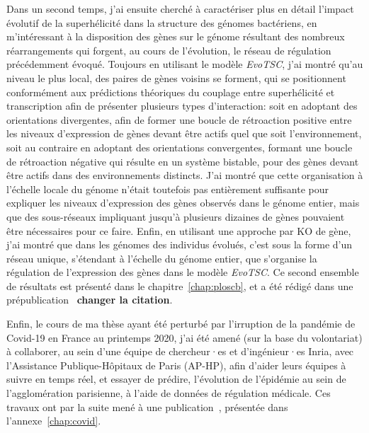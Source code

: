 Dans un second temps, j'ai ensuite cherché à caractériser plus en détail l'impact évolutif de la superhélicité dans la structure des génomes bactériens, en m'intéressant à la disposition des gènes sur le génome résultant des nombreux réarrangements qui forgent, au cours de l'évolution, le réseau de régulation précédemment évoqué.
Toujours en utilisant le modèle \emph{EvoTSC}, j'ai montré qu'au niveau le plus local, des paires de gènes voisins se forment, qui se positionnent conformément aux prédictions théoriques du couplage entre superhélicité et transcription afin de présenter plusieurs types d'interaction: soit en adoptant des orientations divergentes, afin de former une boucle de rétroaction positive entre les niveaux d'expression de gènes devant être actifs quel que soit l'environnement, soit au contraire en adoptant des orientations convergentes, formant une boucle de rétroaction négative qui résulte en un système bistable, pour des gènes devant être actifs dans des environnements distincts.
J'ai montré que cette organisation à l'échelle locale du génome n'était toutefois pas entièrement suffisante pour expliquer les niveaux d'expression des gènes observés dans le génome entier, mais que des sous-réseaux impliquant jusqu'à plusieurs dizaines de gènes pouvaient être nécessaires pour ce faire.
Enfin, en utilisant une approche par KO de gène, j'ai montré que dans les génomes des individus évolués, c'est sous la forme d'un réseau unique, s'étendant à l'échelle du génome entier, que s'organise la régulation de l'expression des gènes dans le modèle \emph{EvoTSC}.
Ce second ensemble de résultats est présenté dans le chapitre~\ref{chap:ploscb}, et a été rédigé dans une prépublication~\citep{grohens2021} \textbf{changer la citation}.

Enfin, le cours de ma thèse ayant été perturbé par l'irruption de la pandémie de Covid-19 en France au printemps 2020, j'ai été amené (sur la base du volontariat) à collaborer, au sein d'une équipe de chercheur·es et d'ingénieur·es Inria, avec l'Assistance Publique-Hôpitaux de Paris (AP-HP), afin d'aider leurs équipes à suivre en temps réel, et essayer de prédire, l'évolution de l'épidémie au sein de l'agglomération parisienne, à l'aide de données de régulation médicale.
Ces travaux ont par la suite mené à une publication~\citep{gaubert2020}, présentée dans l'annexe~\ref{chap:covid}.

